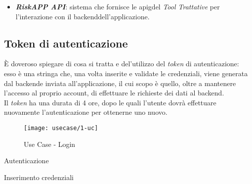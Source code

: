 \begin{itemize}
    \item \textbf{\emph{RiskAPP API}}: sistema che fornisce le \gls{apig}\glsoccur del \emph{Tool Trattative} per l'interazione con il \gls{backend}\glsoccur dell'applicazione.
\end{itemize}

\subsection{Token di autenticazione}
\label{subsec:token-autenticazione}

È doveroso spiegare di cosa si tratta e del'utilizzo del \emph{token} di autenticazione: esso è una stringa che, una volta inserite e validate le credenziali, viene generata dal \gls{backend}\glsoccur e inviata all'applicazione, il cui scopo è quello, oltre a mantenere l'accesso al proprio account, di effettuare le richieste dei dati al \gls{backend}\glsoccur.\\
Il \emph{token} ha una durata di 4 ore, dopo le quali l'utente dovrà effettuare nuovamente l'autenticazione per ottenerne uno nuovo.

\begin{figure}[!h] 
    \centering 
    \texttt{[image: usecase/1-uc]} 
    \caption{Use Case - Login}
\end{figure}

\begin{usecase}{01}{Autenticazione}
    \label{UC01}
\end{usecase}

\begin{usecase}{02}{Inserimento credenziali}
    \label{UC02}
\end{usecase}

